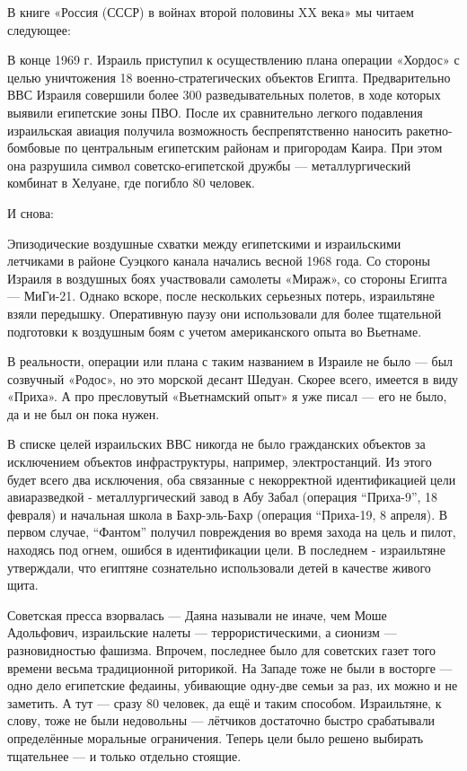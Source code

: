 В книге «Россия (СССР) в войнах второй половины XX века» мы читаем следующее:

\begin{textcitation}
	В конце 1969 г. Израиль приступил к осуществлению плана операции «Хордос» с целью уничтожения 18 военно-стратегических объектов Египта. Предварительно ВВС Израиля совершили более 300 разведывательных полетов, в ходе которых выявили египетские зоны ПВО. После их сравнительно легкого подавления израильская авиация получила возможность беспрепятственно наносить ракетно-бомбовые по центральным египетским районам и пригородам Каира. При этом она разрушила символ советско-египетской дружбы — металлургический комбинат в Хелуане, где погибло 80 человек.
\end{textcitation}

И снова:

\begin{textcitation}
	Эпизодические воздушные схватки между египетскими и израильскими летчиками в районе Суэцкого канала начались весной 1968 года. Со стороны Израиля в воздушных боях участвовали самолеты «Мираж», со стороны Египта — МиГи-21. Однако вскоре, после нескольких серьезных потерь, израильтяне взяли передышку. Оперативную паузу они использовали для более тщательной подготовки к воздушным боям с учетом американского опыта во Вьетнаме. 
\end{textcitation}

В реальности, операции или плана с таким названием в Израиле не было — был созвучный «Родос», но это морской десант Шедуан. Скорее всего, имеется в виду «Приха». А про пресловутый «Вьетнамский опыт» я уже писал — его не было, да и не был он пока нужен.

В списке целей израильских ВВС никогда не было гражданских объектов за исключением объектов инфраструктуры, например, электростанций. Из этого будет всего два исключения, оба связанные с некорректной идентификацией цели авиаразведкой - металлургический завод в Абу Забал (операция “Приха-9”, 18 февраля) и начальная школа в Бахр-эль-Бахр (операция “Приха-19, 8 апреля). В первом случае, “Фантом” получил повреждения во время захода на цель и пилот, находясь под огнем, ошибся в идентификации цели. В последнем - израильтяне утверждали, что египтяне сознательно использовали детей в качестве живого щита.

Советская пресса взорвалась — Даяна называли не иначе, чем Моше Адольфович, израильские налеты — террористическими, а сионизм — разновидностью фашизма. Впрочем, последнее было для советских газет того времени весьма традиционной риторикой. На Западе тоже не были в восторге — одно дело египетские федаины, убивающие одну-две семьи за раз, их можно и не заметить. А тут — сразу 80 человек, да ещё и таким способом. Израильтяне, к слову, тоже не были недовольны — лётчиков достаточно быстро срабатывали определённые моральные ограничения. Теперь цели было решено выбирать тщательнее — и только отдельно стоящие.

